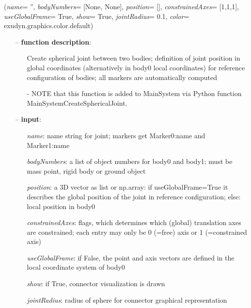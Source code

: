 %
\begin{flushleft}
\label{sec:mainsystemextensions:CreateSphericalJoint}
({\it name}= '', {\it bodyNumbers}= [None, None], {\it position}= [], {\it constrainedAxes}= [1,1,1], {\it useGlobalFrame}= True, {\it show}= True, {\it jointRadius}= 0.1, {\it color}= exudyn.graphics.color.default)
\end{flushleft}
\setlength{\itemindent}{0.7cm}
\begin{itemize}[leftmargin=0.7cm]
\item[--]
{\bf function description}: \vspace{-6pt}
\begin{itemize}[leftmargin=1.2cm]
\setlength{\itemindent}{-0.7cm}
\item[]Create spherical joint between two bodies; definition of joint position in global coordinates (alternatively in body0 local coordinates) for reference configuration of bodies; all markers are automatically computed
\item[]- NOTE that this function is added to MainSystem via Python function MainSystemCreateSphericalJoint.
\end{itemize}
\item[--]
{\bf input}: \vspace{-6pt}
\begin{itemize}[leftmargin=1.2cm]
\setlength{\itemindent}{-0.7cm}
\item[]{\it name}: name string for joint; markers get Marker0:name and Marker1:name
\item[]{\it bodyNumbers}: a list of object numbers for body0 and body1; must be mass point, rigid body or ground object
\item[]{\it position}: a 3D vector as list or np.array: if useGlobalFrame=True it describes the global position of the joint in reference configuration; else: local position in body0
\item[]{\it constrainedAxes}: flags, which determines which (global) translation axes are constrained; each entry may only be 0 (=free) axis or 1 (=constrained axis)
\item[]{\it useGlobalFrame}: if False, the point and axis vectors are defined in the local coordinate system of body0
\item[]{\it show}: if True, connector visualization is drawn
\item[]{\it jointRadius}: radius of sphere for connector graphical representation

\end{itemize}
\end{itemize}
